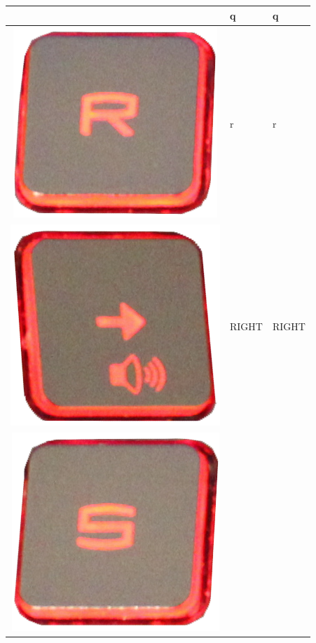 \begin{longtable}{|cll|}
\begin{minipage}[c]{.4\textwidth}
\vspace{0.2cm}
\end{minipage} & q & q\\
\hline
\begin{minipage}[c]{.4\textwidth}
\vspace{0.2cm}
\includegraphics[scale=0.08]{Images/KeyMapping/r}
\vspace{0.2cm}
\end{minipage} & r & r\\
\hline
\begin{minipage}[c]{.4\textwidth}
\vspace{0.2cm}
\includegraphics[scale=0.08]{Images/KeyMapping/RIGHT}
\vspace{0.2cm}
\end{minipage} & RIGHT & RIGHT\\
\hline
\begin{minipage}[c]{.4\textwidth}
\vspace{0.2cm}
\includegraphics[scale=0.08]{Images/KeyMapping/s}

\end{minipage}
\end{longtable}
